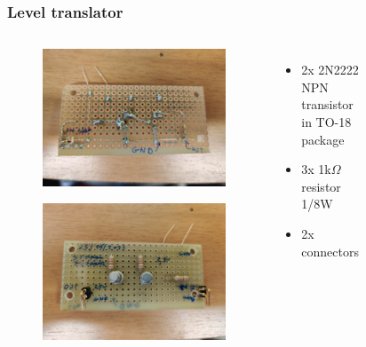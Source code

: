 \documentclass[aspectratio=169]{beamer}
\begin{document}
	\begin{frame}
	\frametitle{Level translator}
	\begin{columns}
		\begin{center}
			\begin{figure}
				\includegraphics[width=0.8 \textwidth]{IMG/level_translator_back-min.jpg}
			\end{figure}
			\begin{figure}
				\includegraphics[width=0.8 \textwidth]{IMG/level_translator_front-min.jpg}
			\end{figure}
		\end{center}
		\begin{itemize}
			\item 2x 2N2222 NPN transistor in TO-18 package
			\item 3x 1k$\Omega$ resistor 1/8W
			\item 2x connectors 
		\end{itemize}
		\begin{figure}

\end{figure}
\end{columns}
\end{frame}
\end{document}
